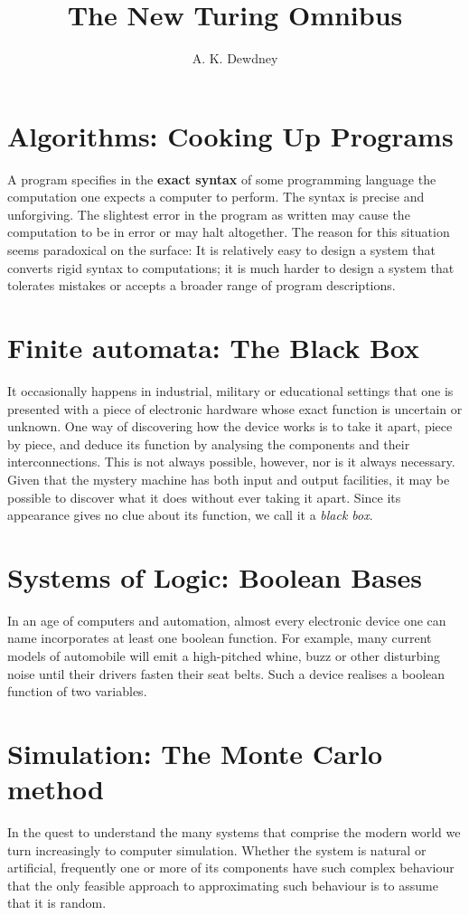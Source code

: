 \documentclass[a4paper]{article}
\begin{document}
\title{The New Turing Omnibus}
\author{A. K. Dewdney}
\maketitle
\tableofcontents
\newpage

\section{Algorithms: Cooking Up Programs}
A program specifies in the \textbf{exact syntax} of some programming language the computation one expects a computer to perform. The syntax is precise and unforgiving. The slightest error in the program as written may cause the computation to be in error or may halt altogether. The reason for this situation seems paradoxical on the surface: It is relatively easy to design a system that converts rigid syntax to computations; it is much harder to design a system that tolerates mistakes or accepts a broader range of program descriptions.

\section{Finite automata: The Black Box}
It occasionally happens in industrial, military or educational settings that one is presented with a piece of electronic hardware whose exact function is uncertain or unknown. One way of discovering how the device works is to take it apart, piece by piece, and deduce its function by analysing the components and their interconnections. This is not always possible, however, nor is it always necessary. Given that the mystery machine has both input and output facilities, it may be possible to discover what it does without ever taking it apart. Since its appearance gives no clue about its function, we call it a \textit{black box}.

\section{Systems of Logic: Boolean Bases}
In an age of computers and automation, almost every electronic device one can name incorporates at least one boolean function. For example, many current models of automobile will emit a high-pitched whine, buzz or other disturbing noise until their drivers fasten their seat belts. Such a device realises a boolean function of two variables.

\section{Simulation: The Monte Carlo method}
In the quest to understand the many systems that comprise the modern world we turn increasingly to computer simulation. Whether the system is natural or artificial, frequently one or more of its components have such complex behaviour that the only feasible approach to approximating such behaviour is to assume that it is random.
\end{document}
